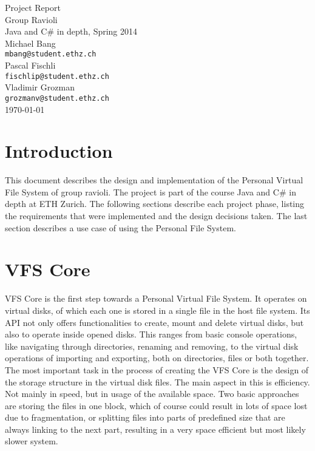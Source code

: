 \documentclass[11pt]{article}
\begin{document}
\begin{center}


\LARGE Project Report\\Group Ravioli \\[0.5cm]

\Large Java and C\# in depth, Spring 2014 \\[0.5cm]

\large Michael Bang\\\small\texttt{mbang@student.ethz.ch}\\[0.05cm]
\large Pascal Fischli\\\small\texttt{fischlip@student.ethz.ch}\\[0.05cm]
\large Vladimir Grozman\\\small\texttt{grozmanv@student.ethz.ch}\\[0.5cm]

{\large \today}\\[1.5cm]

\end{center}


\section{Introduction}
This document describes the design and implementation of the Personal Virtual File System of group ravioli. The project is part of the course Java and C\# in depth at ETH Zurich. The following sections describe each project phase, listing the requirements that were implemented and the design decisions taken. The last section describes a use case of using the Personal File System.

\section{VFS Core}
VFS Core is the first step towards a Personal Virtual File System. It operates on virtual disks, of which each one is stored in a single file in the host file system. Its API not only offers functionalities to create, mount and delete virtual disks, but also to operate inside opened disks. This ranges from basic console operations, like navigating through directories, renaming and removing, to the virtual disk operations of importing and exporting, both on directories, files or both together.\newline
The most important task in the process of creating the VFS Core is the design of the storage structure in the virtual disk files. The main aspect in this is efficiency. Not mainly in speed, but in usage of the available space. Two basic approaches are storing the files in one block, which of course could result in lots of space lost due to fragmentation, or splitting files into parts of predefined size that are always linking to the next part, resulting in a very space efficient but most likely slower system.
\end{document}
